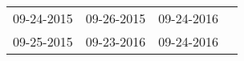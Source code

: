 \begin{supertabular}{llll}
 09-24-2015 &  09-26-2015 &  09-24-2016 \\
 09-25-2015 &  09-23-2016 &  09-24-2016 \\
\end{supertabular}
